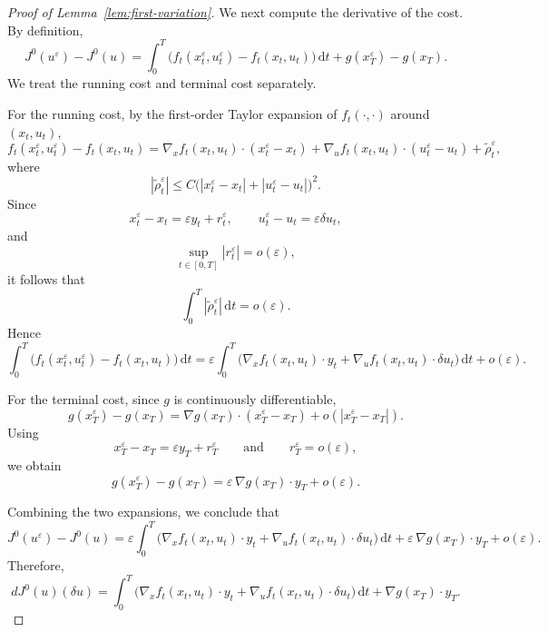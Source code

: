 \documentclass[10pt,a4paper]{amsart}
\newcommand{\dd}{\,\mathrm{d}}
\begin{document}
\begin{proof}[Proof of Lemma~\ref{lem:first-variation}]
We next compute the derivative of the cost.
By definition,
\[
J^0(u^\varepsilon)-J^0(u)
=
\int_0^T \Big(f_t(x_t^\varepsilon,u_t^\varepsilon)-f_t(x_t,u_t)\Big)\dd t
+
g(x_T^\varepsilon)-g(x_T).
\]
We treat the running cost and terminal cost separately.

For the running cost, by the first-order Taylor expansion of $f_t(\cdot,\cdot)$
around $(x_t,u_t)$,
\[
f_t(x_t^\varepsilon,u_t^\varepsilon)-f_t(x_t,u_t)
=
\nabla_x f_t(x_t,u_t)\cdot (x_t^\varepsilon-x_t)
+
\nabla_u f_t(x_t,u_t)\cdot (u_t^\varepsilon-u_t)
+
\tilde\rho_t^\varepsilon,
\]
where
\[
|\tilde\rho_t^\varepsilon|
\le
C\Big(|x_t^\varepsilon-x_t|+|u_t^\varepsilon-u_t|\Big)^2.
\]
Since
\[
x_t^\varepsilon-x_t=\varepsilon y_t+r_t^\varepsilon,
\qquad
u_t^\varepsilon-u_t=\varepsilon \delta u_t,
\]
and
\[
\sup_{t\in[0,T]}|r_t^\varepsilon|=o(\varepsilon),
\]
it follows that
\[
\int_0^T |\tilde\rho_t^\varepsilon|\dd t=o(\varepsilon).
\]
Hence
\[
\int_0^T \Big(f_t(x_t^\varepsilon,u_t^\varepsilon)-f_t(x_t,u_t)\Big)\dd t
=
\varepsilon\int_0^T
\Big(
\nabla_x f_t(x_t,u_t)\cdot y_t
+
\nabla_u f_t(x_t,u_t)\cdot \delta u_t
\Big)\dd t
+o(\varepsilon).
\]

For the terminal cost, since $g$ is continuously differentiable,
\[
g(x_T^\varepsilon)-g(x_T)
=
\nabla g(x_T)\cdot (x_T^\varepsilon-x_T)+o(|x_T^\varepsilon-x_T|).
\]
Using
\[
x_T^\varepsilon-x_T=\varepsilon y_T+r_T^\varepsilon
\qquad\text{and}\qquad
r_T^\varepsilon=o(\varepsilon),
\]
we obtain
\[
g(x_T^\varepsilon)-g(x_T)
=
\varepsilon\,\nabla g(x_T)\cdot y_T+o(\varepsilon).
\]

Combining the two expansions, we conclude that
\[
J^0(u^\varepsilon)-J^0(u)
=
\varepsilon\int_0^T
\Big(
\nabla_x f_t(x_t,u_t)\cdot y_t
+
\nabla_u f_t(x_t,u_t)\cdot \delta u_t
\Big)\dd t
+
\varepsilon\,\nabla g(x_T)\cdot y_T
+
o(\varepsilon).
\]
Therefore,
\begin{equation}\label{eq:pre-adjoint-first-variation}
dJ^0(u)(\delta u)
=
\int_0^T
\Big(
\nabla_x f_t(x_t,u_t)\cdot y_t
+
\nabla_u f_t(x_t,u_t)\cdot \delta u_t
\Big)\dd t
+
\nabla g(x_T)\cdot y_T.
\end{equation}


\end{proof}
\end{document}
